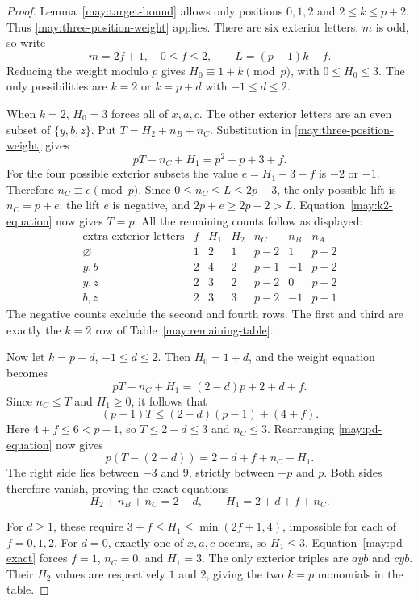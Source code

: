 \begin{proof}
Lemma~\ref{may:target-bound} allows only positions $0,1,2$ and
$2\leq k\leq p+2$.  Thus \eqref{may:three-position-weight} applies.
There are six exterior letters; $m$ is odd, so write
\[
 m=2f+1,\quad 0\leq f\leq2,\qquad L=(p-1)k-f.
\]
Reducing the weight modulo $p$ gives
$H_0\equiv1+k\pmod p$, with $0\leq H_0\leq3$.
The only possibilities are $k=2$ or $k=p+d$ with
$-1\leq d\leq2$.

When $k=2$, $H_0=3$ forces all of $x,a,c$.  The other exterior letters
are an even subset of $\{y,b,z\}$.  Put
$T=H_2+n_B+n_C$.  Substitution in
\eqref{may:three-position-weight} gives
\begin{equation}
 pT-n_C+H_1=p^2-p+3+f.
 \label{may:k2-equation}
\end{equation}
For the four possible exterior subsets the value
$e=H_1-3-f$ is $-2$ or $-1$.  Therefore
$n_C\equiv e\pmod p$.  Since
$0\leq n_C\leq L\leq2p-3$, the only possible lift is
$n_C=p+e$: the lift $e$ is negative, and $2p+e\geq2p-2>L$.
Equation~\eqref{may:k2-equation} now gives $T=p$.
All the remaining counts follow as displayed:
\[
\begin{array}{c|c|c|c|c|c|c}
\text{extra exterior letters}&f&H_1&H_2&n_C&n_B&n_A\\ \hline
\varnothing&1&2&1&p-2&1&p-2\\
y,b&2&4&2&p-1&-1&p-2\\
y,z&2&3&2&p-2&0&p-2\\
b,z&2&3&3&p-2&-1&p-1
\end{array}
\]
The negative counts exclude the second and fourth rows.  The first and
third are exactly the $k=2$ row of Table~\ref{may:remaining-table}.

Now let $k=p+d$, $-1\leq d\leq2$.  Then $H_0=1+d$, and the weight
equation becomes
\begin{equation}
 pT-n_C+H_1=(2-d)p+2+d+f.
 \label{may:pd-equation}
\end{equation}
Since $n_C\leq T$ and $H_1\geq0$, it follows that
\[
 (p-1)T\leq(2-d)(p-1)+(4+f).
\]
Here $4+f\leq6<p-1$, so $T\leq2-d\leq3$ and $n_C\leq3$.
Rearranging \eqref{may:pd-equation} now gives
\[
 p(T-(2-d))=2+d+f+n_C-H_1.
\]
The right side lies between $-3$ and $9$, strictly between $-p$ and
$p$.  Both sides therefore vanish, proving the exact equations
\begin{equation}
 H_2+n_B+n_C=2-d,\qquad H_1=2+d+f+n_C.
 \label{may:pd-exact}
\end{equation}

For $d\geq1$, these require
$3+f\leq H_1\leq\min(2f+1,4)$, impossible for each of
$f=0,1,2$.  For $d=0$, exactly one of $x,a,c$ occurs, so $H_1\leq3$.
Equation~\eqref{may:pd-exact} forces $f=1$, $n_C=0$, and $H_1=3$.
The only exterior triples are $ayb$ and $cyb$.  Their $H_2$ values are
respectively $1$ and $2$, giving the two $k=p$ monomials in the table.


\end{proof}
